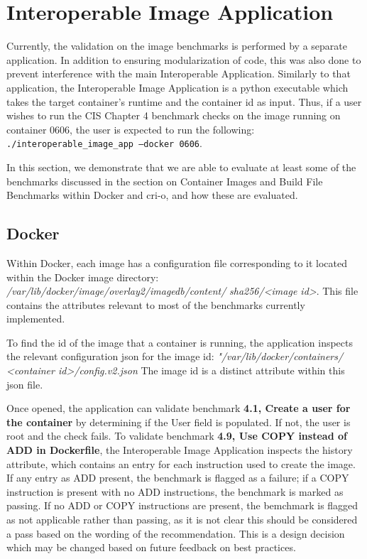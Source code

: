 \documentclass[times, twoside, watermark]{zHenriquesLab-StyleBioRxiv}
\begin{document}
\section*{Interoperable Image Application}

Currently, the validation on the image benchmarks is performed by a separate application. In addition to ensuring modularization of code, this was also done to prevent interference with the main Interoperable Application. Similarly to that application, the Interoperable Image Application is a python executable which takes the target container's runtime and the container id as input. Thus, if a user wishes to run the CIS Chapter 4 benchmark checks on the image running on container 0606, the user is expected to run the following:
\texttt{./interoperable\_image\_app --docker 0606}.

In this section, we demonstrate that we are able to evaluate at least some of the benchmarks discussed in the section on Container Images and Build File Benchmarks within Docker and cri-o, and how these are evaluated. 

\subsection*{Docker} Within Docker, each image has a configuration file corresponding to it located within the Docker image directory: \textit{/var/lib/docker/image/overlay2/imagedb/content/}
\textit{sha256/<image id>}. This file contains the attributes relevant to most of the benchmarks currently implemented.

To find the id of the image that a container is running, the application inspects the relevant configuration json for the image id: \textit{"/var/lib/docker/containers/}
\textit{<container id>/config.v2.json} The image id is a distinct attribute within this json file. 

Once opened, the application can validate benchmark \textbf{4.1, Create a user for the container} by determining if the User field is populated. If not, the user is root and the check fails. To validate benchmark \textbf{4.9, Use COPY instead of ADD in Dockerfile}, the Interoperable Image Application inspects the history attribute, which contains an entry for each instruction used to create the image. If any entry as ADD present, the benchmark is flagged as a failure; if a COPY instruction is present with no ADD instructions, the benchmark is marked as passing. If no ADD or COPY instructions are present, the bemchmark is flagged as not applicable rather than passing, as it is not clear this should be considered a pass based on the wording of the recommendation. This is a design decision which may be changed based on future feedback on best practices.
\end{document}
